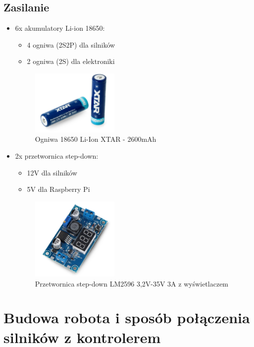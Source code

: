 \documentclass[a4paper,twoside,12pt]{book}
\begin{document}
\subsection{Zasilanie}
\begin{itemize}
\item 6x akumulatory Li-ion 18650:
	\begin{itemize}
	\item 4 ogniwa (2S2P) dla silników
	\item 2 ogniwa (2S) dla elektroniki
	\end{itemize}
	\begin{figure}[!hb]
		\centering
		\includegraphics[width=0.4\textwidth]{images/ogniwo.png}
		\caption{Ogniwa 18650 Li-Ion XTAR - 2600mAh}
		\label{fig:ogniwa}
		\end{figure}
		\newpage
\item 2x przetwornica step-down:
	\begin{itemize}
	\item 12V dla silników
	\item 5V dla Raspberry Pi
	\end{itemize}
	\begin{figure}[!hb]
		\centering
		\includegraphics[width=0.4\textwidth]{images/przetwo.png}
		\caption{Przetwornica step-down LM2596 3,2V-35V 3A z wyświetlaczem}
		\label{fig:przetwo}\newpage
		\end{figure}
		\newpage
\end{itemize}



\section{Budowa robota i sposób połączenia silników z kontrolerem}
\end{document}
